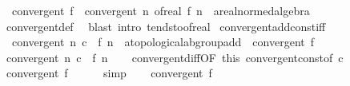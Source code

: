 \begin{isabellebody}
\ \ {\isachardoublequoteopen}convergent\ f\ {\isasymLongrightarrow}\ convergent\ {\isacharparenleft}{\kern0pt}{\isasymlambda}n{\isachardot}{\kern0pt}\ of{\isacharunderscore}{\kern0pt}real\ {\isacharparenleft}{\kern0pt}f\ n{\isacharparenright}{\kern0pt}\ {\isacharcolon}{\kern0pt}{\isacharcolon}{\kern0pt}\ {\isacharprime}{\kern0pt}a{\isacharcolon}{\kern0pt}{\isacharcolon}{\kern0pt}real{\isacharunderscore}{\kern0pt}normed{\isacharunderscore}{\kern0pt}algebra{\isacharunderscore}{\kern0pt}{}{\isacharparenright}{\kern0pt}{\isachardoublequoteclose}\isanewline
%
\isadelimproof
\ \ %
\endisadelimproof
%
\isatagproof
{}\isamarkupfalse%
\ convergent{\isacharunderscore}{\kern0pt}def\ \isamarkupfalse%
\ {\isacharparenleft}{\kern0pt}blast\ intro{\isacharbang}{\kern0pt}{\isacharcolon}{\kern0pt}\ tendsto{\isacharunderscore}{\kern0pt}of{\isacharunderscore}{\kern0pt}real{\isacharparenright}{\kern0pt}%
\endisatagproof
{\isafoldproof}%
%
\isadelimproof
\isanewline
%
\endisadelimproof
\isanewline
{}\isamarkupfalse%
\ convergent{\isacharunderscore}{\kern0pt}add{\isacharunderscore}{\kern0pt}const{\isacharunderscore}{\kern0pt}iff{\isacharcolon}{\kern0pt}\isanewline
\ \ {\isachardoublequoteopen}convergent\ {\isacharparenleft}{\kern0pt}{\isasymlambda}n{\isachardot}{\kern0pt}\ c\ {\isacharplus}{\kern0pt}\ f\ n\ {\isacharcolon}{\kern0pt}{\isacharcolon}{\kern0pt}\ {\isacharprime}{\kern0pt}a{\isacharcolon}{\kern0pt}{\isacharcolon}{\kern0pt}topological{\isacharunderscore}{\kern0pt}ab{\isacharunderscore}{\kern0pt}group{\isacharunderscore}{\kern0pt}add{\isacharparenright}{\kern0pt}\ {\isasymlongleftrightarrow}\ convergent\ f{\isachardoublequoteclose}\isanewline
%
\isadelimproof
%
\endisadelimproof
%
\isatagproof
{}\isamarkupfalse%
\isanewline
\ \ \isamarkupfalse%
\ {\isachardoublequoteopen}convergent\ {\isacharparenleft}{\kern0pt}{\isasymlambda}n{\isachardot}{\kern0pt}\ c\ {\isacharplus}{\kern0pt}\ f\ n{\isacharparenright}{\kern0pt}{\isachardoublequoteclose}\isanewline
\ \ \isamarkupfalse%
\ convergent{\isacharunderscore}{\kern0pt}diff{\isacharbrackleft}{\kern0pt}OF\ this\ convergent{\isacharunderscore}{\kern0pt}const{\isacharbrackleft}{\kern0pt}of\ c{\isacharbrackright}{\kern0pt}{\isacharbrackright}{\kern0pt}\ \isamarkupfalse%
\ {\isachardoublequoteopen}convergent\ f{\isachardoublequoteclose}\isanewline
\ \ \ \ \isamarkupfalse%
\ simp\isanewline
{}\isamarkupfalse%
\isanewline
\ \ \isamarkupfalse%
\ {\isachardoublequoteopen}convergent\ f{\isachardoublequoteclose}\isanewline

\end{isabellebody}
